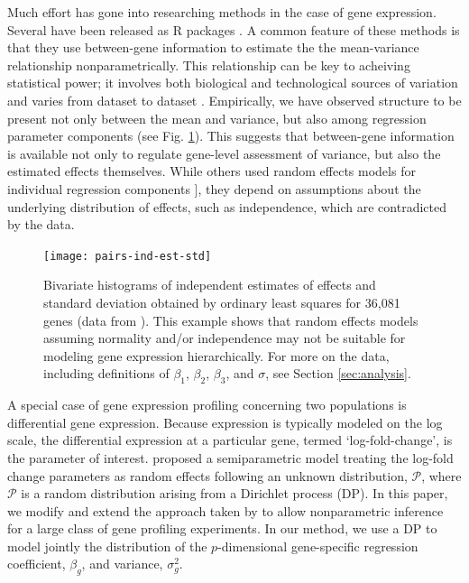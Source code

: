 Much effort has gone into researching methods in the case of gene expression. Several have been released as R packages \citep{edger2010,deseq2014,voom}. A common feature of these methods is that they use between-gene information to estimate the the  mean-variance relationship nonparametrically. This relationship can be key to acheiving statistical power; it involves both biological and technological sources of variation and varies from dataset to dataset \citep{voom}. Empirically, we have observed structure to be present not only between the mean and variance, but also among regression parameter components (see Fig. \ref{pairs-ind-est}). This suggests that between-gene information is available not only to regulate gene-level assessment of variance, but also the estimated effects themselves. While others used random effects models for individual regression components \citep{deseq2014,landau}], they depend on assumptions about the underlying distribution of effects, such as independence, which are contradicted by the data.

\begin{figure}[ht]
\centering
\texttt{[image: pairs-ind-est-std]}
\caption{\small Bivariate histograms of independent estimates of effects and standard deviation obtained by ordinary least squares for 36,081 genes (data from \cite{paschold}). This example shows that random effects models assuming normality and/or independence may not be suitable for modeling gene expression hierarchically. For more on the data, including definitions of $\beta_1$, $\beta_2$, $\beta_3$, and $\sigma$, see Section \ref{sec:analysis}.}
\label{pairs-ind-est}
\end{figure}

A special case of gene expression profiling concerning two populations is differential gene expression. Because expression is typically modeled on the log scale, the differential expression at a particular gene, termed `log-fold-change', is the parameter of interest. \citet{liu} proposed a semiparametric model treating the log-fold change parameters as random effects following an unknown distribution, $\mathcal{P}$, where $\mathcal{P}$ is a random distribution arising from a Dirichlet process (DP). In this paper, we modify and extend the approach taken by \cite{liu} to allow nonparametric inference for a large class of gene profiling experiments. In our method, we use a DP to model jointly the distribution of the $p$-dimensional gene-specific regression coefficient, $\beta_g$, and variance, $\sigma^2_g$.

